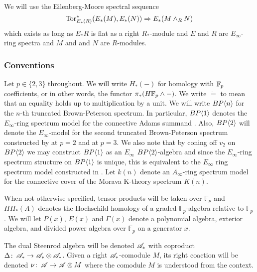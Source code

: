 We will use the Eilenberg-Moore spectral sequence
\[ \operatorname{Tor}^*_{E_*(R)}(E_*(M),E_*(N))\Rightarrow E_*(M\wedge_R N) \]
which exists as long as $E_*R$ is flat as a right $R_*$-module and $E$ and $R$ are $E_{\infty}$-ring spectra and $M$ and and $N$ are $R$-modules. 

\subsubsection*{Conventions}
Let $p\in\{2,3\}$ throughout. We will write $H_*(-)$ for homology with $\mathbb{F}_p$ coefficients, or in other words, the functor $\pi_*(H\mathbb{F}_p\wedge -)$. We write $\dot{=}$ to mean that an equality holds up to multiplication by a unit. We will write $BP\langle n \rangle$ for the $n$-th truncated Brown-Peterson spectrum. In particular, $BP\langle 1 \rangle$ denotes the $E_{\infty}$-ring spectrum model for the connective Adams summand \cite{McClureStaffeldt}. Also, $BP\langle 2 \rangle$ will denote the $E_{\infty}$-model for the second truncated Brown-Peterson spectrum constructed by \cite{LawsonNaumann} at $p=2$ and \cite{HillLawson} at $p=3$. 
We also note that by coning off $v_2$ on $BP\langle 2 \rangle$ we may construct $BP\langle 1 \rangle$ as an $E_{\infty}$ $BP\langle 2 \rangle$-algebra and since the $E_{\infty}$-ring spectrum structure on $BP\langle 1 \rangle$ is unique, this is equivalent to the $E_{\infty}$ ring spectrum model constructed in \cite{McClureStaffeldt}. Let $k(n)$ denote an $A_{\infty}$-ring spectrum model for the connective cover of the Morava K-theory spectrum $K(n)$. 

When not otherwise specified, tensor products will be taken over $\mathbb{F}_p$ and $HH_*(A)$ denotes the Hochschild homology of a graded $\mathbb{F}_p$-algebra relative to $\mathbb{F}_p$. We will let $P(x)$, $E(x)$ and $\Gamma(x)$ denote a polynomial algebra, exterior algebra, and divided power algebra over $\mathbb{F}_p$ on a generator $x$. 

The dual Steenrod algebra will be denoted $\mathscr{A}_*$ with coproduct $\Delta\colon \thinspace \mathscr{A}_*\to \mathscr{A}_*\otimes \mathscr{A}_*$. Given a right $\mathscr{A}_*$-comodule $M$, its right coaction will be denoted $\nu\colon \thinspace \mathscr{A}\to \mathscr{A}\otimes M$ where the comodule $M$ is understood from the context. 